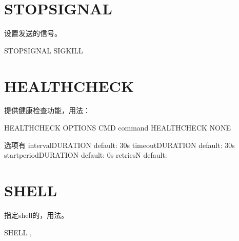\documentclass[letterpaper,10pt,english]{sphinxmanual}
\begin{document}
\section{STOPSIGNAL}
\label{\detokenize{_u8fd0_u884c_u5e94_u7528/05-dockerfile_u53c2_u8003:stopsignal}}
设置发送的信号。

%
\begin{sphinxVerbatim}[commandchars=\\\{\}]
STOPSIGNAL SIGKILL
\end{sphinxVerbatim}


\section{HEALTHCHECK}
\label{\detokenize{_u8fd0_u884c_u5e94_u7528/05-dockerfile_u53c2_u8003:healthcheck}}
提供健康检查功能，用法：

%
\begin{sphinxVerbatim}[commandchars=\\\{\}]
HEALTHCHECK \PYG{o}{[}OPTIONS\PYG{o}{]} CMD command
HEALTHCHECK NONE

    \PYGZsh{} 选项有
    \PYGZhy{}\PYGZhy{}intervalDURATION default: 30s
    \PYGZhy{}\PYGZhy{}timeoutDURATION default: 30s
    \PYGZhy{}\PYGZhy{}start\PYGZhy{}periodDURATION default: 0s
    \PYGZhy{}\PYGZhy{}retriesN default: 
\end{sphinxVerbatim}


\section{SHELL}
\label{\detokenize{_u8fd0_u884c_u5e94_u7528/05-dockerfile_u53c2_u8003:shell}}
指定shell的，用法。

%
\begin{sphinxVerbatim}[commandchars=\\\{\}]
SHELL \PYG{o}{[}, \PYG{o}{]}
\end{sphinxVerbatim}



\renewcommand{\indexname}{索引}
\printindex
\end{document}
